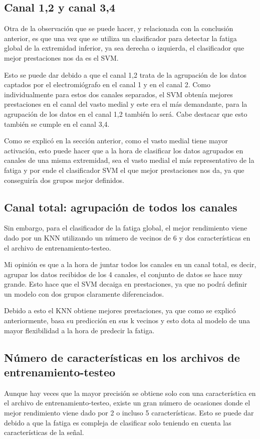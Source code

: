 \subsection{Canal 1,2 y canal 3,4}
Otra de la observación  que se puede hacer, y relacionada con la conclusión anterior, es que una vez que se utiliza un clasificador para detectar la fatiga global de la extremidad inferior, ya sea derecha o izquierda, el clasificador que mejor prestaciones nos da es el SVM. 

Esto se puede dar debido a que el canal 1,2 trata de la agrupación de los datos captados por el electromiógrafo en el canal 1 y en el canal 2. Como individualmente para estos dos canales separados, el SVM obtenía mejores prestaciones en el canal del vasto medial y este era el más demandante, para la agrupación de los datos en el canal 1,2 también lo será. Cabe destacar que esto también se cumple en el canal 3,4.

Como se explicó en la sección anterior, como el vasto medial tiene mayor activación, esto puede hacer que a la hora de clasificar los datos agrupados en canales de una misma extremidad, sea el vasto medial el más representativo de la fatiga y por ende el clasificador SVM el que mejor prestaciones nos da, ya que conseguiría dos grupos mejor definidos.

\subsection{Canal total: agrupación de todos los canales}
Sin embargo, para el clasificador de la fatiga global, el mejor rendimiento viene dado por un KNN utilizando un número de vecinos de 6 y dos características en el archivo de entrenamiento-testeo.

Mi opinión es que a la hora de juntar todos los canales en un canal total, es decir, agrupar los datos recibidos de los 4 canales, el conjunto de datos se hace muy grande. Esto hace que el SVM decaiga en prestaciones, ya que no podrá definir un modelo con dos grupos claramente diferenciados.

Debido a esto el KNN obtiene mejores prestaciones, ya que como se explicó anteriormente, basa su predicción en sus k vecinos y esto dota al modelo de una mayor flexibilidad a la hora de predecir la fatiga.

\subsection{Número de características en los archivos de \newline entrenamiento-testeo}
Aunque hay veces que la mayor precisión se obtiene solo con una característica en el archivo de entrenamiento-testeo, existe un gran número de ocasiones donde el mejor rendimiento viene dado por 2 o incluso 5 características. Esto se puede dar debido a que la fatiga es compleja de clasificar solo teniendo en cuenta las características de la señal.

